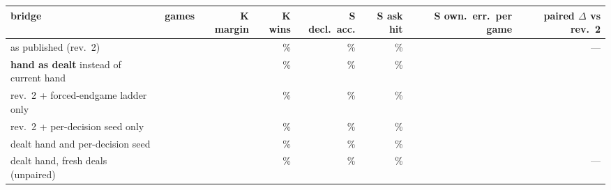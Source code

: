 \begin{tabularx}{\linewidth}{Q{1.6}N{0.75}N{1.25}N{0.8}N{0.75}N{0.7}N{0.85}N{1.3}}
\toprule
bridge & games & K margin & K wins & S decl.\ acc. & S ask hit & S own.\ err.\ per game & paired $\Delta$ vs rev.~2 \\
\midrule
as published (rev.~2) & \kcVRevTwoGames{} & \ci{$\kcVRevTwoMargin{}$}{\kcVRevTwoLo{},\,\kcVRevTwoHi{}} & \kcVRevTwoWin{}\% & \kcVRevTwoDeclS{}\% & \kcVRevTwoAskS{}\% & \kcVRevTwoOwnErr{} & --- \\
\textbf{hand as dealt} instead of current hand & \kcVDealtGames{} & \ci{$\kcVDealtMargin{}$}{\kcVDealtLo{},\,\kcVDealtHi{}} & \kcVDealtWin{}\% & \kcVDealtDeclS{}\% & \kcVDealtAskS{}\% & \kcVDealtOwnErr{} & \ci{$\kcVDealtPaired{}$}{\kcVDealtPairedLo{},\,\kcVDealtPairedHi{}} \\
rev.~2 + forced-endgame ladder only & \kcVLadderGames{} & \ci{$\kcVLadderMargin{}$}{\kcVLadderLo{},\,\kcVLadderHi{}} & \kcVLadderWin{}\% & \kcVLadderDeclS{}\% & \kcVLadderAskS{}\% & \kcVLadderOwnErr{} & \ci{$\kcVLadderPaired{}$}{\kcVLadderPairedLo{},\,\kcVLadderPairedHi{}} \\
rev.~2 + per-decision seed only & \kcVSeedGames{} & \ci{$\kcVSeedMargin{}$}{\kcVSeedLo{},\,\kcVSeedHi{}} & \kcVSeedWin{}\% & \kcVSeedDeclS{}\% & \kcVSeedAskS{}\% & \kcVSeedOwnErr{} & \ci{$\kcVSeedPaired{}$}{\kcVSeedPairedLo{},\,\kcVSeedPairedHi{}} \\
dealt hand and per-decision seed & \kcVDealtSeedGames{} & \ci{$\kcVDealtSeedMargin{}$}{\kcVDealtSeedLo{},\,\kcVDealtSeedHi{}} & \kcVDealtSeedWin{}\% & \kcVDealtSeedDeclS{}\% & \kcVDealtSeedAskS{}\% & \kcVDealtSeedOwnErr{} & \ci{$\kcVDealtSeedPaired{}$}{\kcVDealtSeedPairedLo{},\,\kcVDealtSeedPairedHi{}} \\
dealt hand, fresh deals (unpaired) & \kcVDealtBigGames{} & \ci{$\kcVDealtBigMargin{}$}{\kcVDealtBigLo{},\,\kcVDealtBigHi{}} & \kcVDealtBigWin{}\% & \kcVDealtBigDeclS{}\% & \kcVDealtBigAskS{}\% & \kcVDealtBigOwnErr{} & --- \\
\bottomrule
\end{tabularx}
